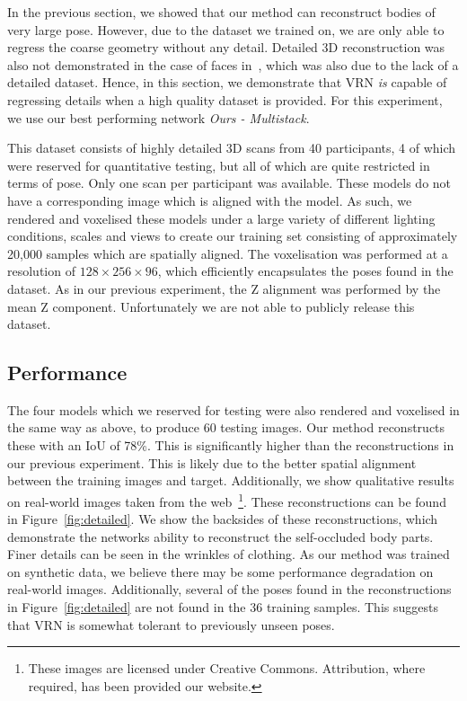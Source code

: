 In the previous section, we showed that our method can reconstruct
bodies of very large pose. However, due to the dataset we trained on,
we are only able to regress the coarse geometry without any
detail. Detailed 3D reconstruction was also not demonstrated in the
case of faces in~\cite{jackson2017vrn}, which was also due to the lack
of a detailed dataset. Hence, in this section, we demonstrate that VRN
\textit{is} capable of regressing details when a high quality dataset
is provided. For this experiment, we use our best performing network
\textit{Ours - Multistack}.

This dataset consists of highly detailed 3D scans from 40
participants, 4 of which were reserved for quantitative testing, but
all of which are quite restricted in terms of pose. Only one scan per
participant was available. These models do not have a corresponding
image which is aligned with the model. As such, we rendered and
voxelised these models under a large variety of different lighting
conditions, scales and views to create our training set consisting of
approximately 20,000 samples which are spatially aligned.  The
voxelisation was performed at a resolution of
$128\times 256\times 96$, which efficiently encapsulates the poses
found in the dataset. As in our previous experiment, the Z alignment
was performed by the mean Z component. Unfortunately we are not able
to publicly release this dataset.

\subsection{Performance}

The four models which we reserved for testing were also rendered and
voxelised in the same way as above, to produce 60 testing images. Our
method reconstructs these with an IoU of 78\%. This is significantly
higher than the reconstructions in our previous experiment. This is
likely due to the better spatial alignment between the training images
and target. Additionally, we show qualitative results on real-world
images taken from the web~\footnote{These images are licensed under
  Creative Commons. Attribution, where required, has been provided our
  website.}. These reconstructions can be found in
Figure~\ref{fig:detailed}. We show the backsides of these
reconstructions, which demonstrate the networks ability to reconstruct
the self-occluded body parts. Finer details can be seen in the
wrinkles of clothing. As our method was trained on synthetic data, we
believe there may be some performance degradation on real-world
images. Additionally, several of the poses found in the
reconstructions in Figure~\ref{fig:detailed} are not found in the 36
training samples. This suggests that VRN is somewhat tolerant to
previously unseen poses.



